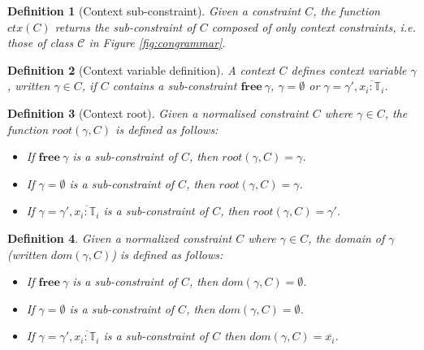 \documentclass[preprint]{sigplanconf}
\newtheorem{defn}{Definition}
\newcommand{\figref}[1]{Figure \ref{#1}}
\newcommand{\free}[1]{\mathbf{free}\:#1}
\newcommand{\tinf}{\mathbb{T}}
\begin{document}
\begin{defn}[Context sub-constraint]
Given a constraint $C$, the function $ctx(C)$ returns the sub-constraint
of $C$ composed of only context constraints, i.e. those of class $\mathcal{C}$
in \figref{fig:congrammar}.
\end{defn}

\begin{defn}[Context variable definition]
A context $C$ {\it defines} context variable $\gamma$, written
$\gamma \in C$, if $C$ contains a sub-constraint $\free{\gamma}$,
$\gamma = \emptyset$ or $\gamma = \gamma', \overline{x_i : \tinf_i}$.
\end{defn}

\begin{defn}[Context root]
Given a normalised constraint $C$ where $\gamma \in C$, the 
function $root(\gamma, C)$ is defined as follows:

\begin{itemize}
\item If $\free{\gamma}$ is a sub-constraint of $C$, then $root(\gamma, C) = \gamma$.
\item If $\gamma = \emptyset$ is a sub-constraint of $C$, then $root(\gamma, C) = \gamma$.
\item If $\gamma = \gamma', \overline{x_i : \tinf_i}$ is a sub-constraint of $C$, then
$root(\gamma, C) = \gamma'$.
\end{itemize}
\end{defn}

\begin{defn}
Given a normalized constraint $C$ where $\gamma \in C$,
the {\it domain} of $\gamma$ (written $dom(\gamma, C)$) is defined as follows:

\begin{itemize}
\item If $\free{\gamma}$ is a sub-constraint of $C$, 
then $dom(\gamma, C) = \emptyset$.
\item If $\gamma = \emptyset$ is a sub-constraint of $C$,
then $dom(\gamma, C) = \emptyset$.
\item If $\gamma = \gamma', \overline{x_i : \tinf_i}$ is a sub-constraint of $C$
then $dom(\gamma, C) = \overline{x_i}$.
\end{itemize}
\end{defn}
\end{document}
